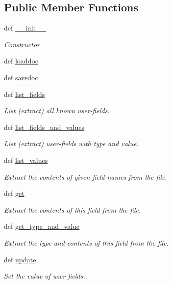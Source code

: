 \subsection*{Public Member Functions}
\begin{DoxyCompactItemize}
\item 
def \hyperlink{classodf_1_1userfield_1_1UserFields_a5181a6106854423e1e28a83455aa9e94}{\+\_\+\+\_\+init\+\_\+\+\_\+}
\begin{DoxyCompactList}\small\item\em Constructor. \end{DoxyCompactList}\item 
def \hyperlink{classodf_1_1userfield_1_1UserFields_a65ccd99e2c198f06b55551d6a7bbf59a}{loaddoc}
\item 
def \hyperlink{classodf_1_1userfield_1_1UserFields_ae5336dcb2cdaee62f02d16cdb8945a2f}{savedoc}
\item 
def \hyperlink{classodf_1_1userfield_1_1UserFields_a9151edeae09fcea4b334a445d7efc6b0}{list\+\_\+fields}
\begin{DoxyCompactList}\small\item\em List (extract) all known user-\/fields. \end{DoxyCompactList}\item 
def \hyperlink{classodf_1_1userfield_1_1UserFields_ae67ac78a3c883117d523f245f076b227}{list\+\_\+fields\+\_\+and\+\_\+values}
\begin{DoxyCompactList}\small\item\em List (extract) user-\/fields with type and value. \end{DoxyCompactList}\item 
def \hyperlink{classodf_1_1userfield_1_1UserFields_a1ca142bc38126c2d15a9a40e94c9d21c}{list\+\_\+values}
\begin{DoxyCompactList}\small\item\em Extract the contents of given field names from the file. \end{DoxyCompactList}\item 
def \hyperlink{classodf_1_1userfield_1_1UserFields_a916cc9d873f57f30b69e752bb48d5bff}{get}
\begin{DoxyCompactList}\small\item\em Extract the contents of this field from the file. \end{DoxyCompactList}\item 
def \hyperlink{classodf_1_1userfield_1_1UserFields_a532884dffd16a0a946aa961ea442d3ca}{get\+\_\+type\+\_\+and\+\_\+value}
\begin{DoxyCompactList}\small\item\em Extract the type and contents of this field from the file. \end{DoxyCompactList}\item 
def \hyperlink{classodf_1_1userfield_1_1UserFields_aa13e8293efd5d183ac771d07b56a4558}{update}
\begin{DoxyCompactList}\small\item\em Set the value of user fields. \end{DoxyCompactList}\end{DoxyCompactItemize}
